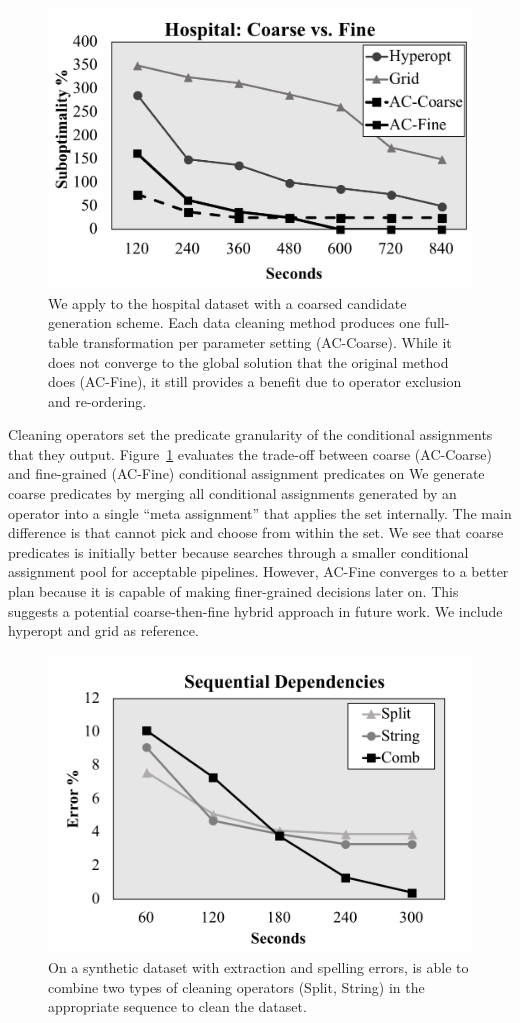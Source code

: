 \begin{figure}[h]
\centering
 \includegraphics[width=.8\columnwidth]{exp/exp8.png}
 \caption{We apply \sys to the hospital dataset with a coarsed candidate generation scheme. Each data cleaning method produces one full-table transformation per parameter setting (AC-Coarse). While it does not converge to the global solution that the original method does (AC-Fine), it still provides a benefit due to operator exclusion and re-ordering. \label{exp8}}
\end{figure}

Cleaning operators set the predicate granularity of the conditional assignments that they output.  Figure~\ref{exp8} evaluates the trade-off between coarse (AC-Coarse) and fine-grained (AC-Fine) conditional assignment predicates on \sys We generate coarse predicates by merging all conditional assignments generated by an operator into a single ``meta assignment'' that applies the set internally.  The main difference is that \sys cannot pick and choose from within the set.   We see that coarse predicates is initially better because \sys searches through a smaller conditional assignment pool for acceptable pipelines.  However, AC-Fine converges to a better plan because it is capable of making finer-grained decisions later on.  This suggests a potential coarse-then-fine hybrid approach in future work.  We include hyperopt and grid as reference. 




\begin{figure}[h]
\centering
 \includegraphics[width=.8\columnwidth]{exp/exp10.png}
 \caption{On a synthetic dataset with extraction and spelling errors, \sys is able to combine two types of cleaning operators (Split, String) in the appropriate sequence to clean the dataset.\label{exp10}}
\end{figure}

